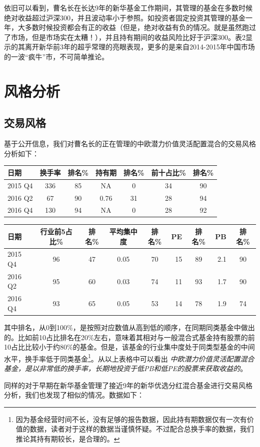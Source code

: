 \documentclass[hyperref,]{ctexart}
\begin{document}
依旧可以看到，曹名长在长达9年的新华基金工作期间，其管理的基金在多数时候绝对收益超过沪深300，并且波动率小于参照。如投资者固定投资其管理的基金一年，大多数时候投资都会有正的收益（但是，绝对收益有负的情况。就是虽然跑过了市场，但是市场实在太糟！），并且持有期间的收益风险比好于沪深300。表2显示的其离开新华前3年的超乎常理的亮眼表现，更多的是来自2014-2015年中国市场的一波``疯牛''市，不可简单推论。

\section{风格分析}

\subsection{交易风格}

基于公开信息，我们对曹名长的正在管理的中欧潜力价值灵活配置混合的交易风格分析如下：

\begin{longtable}[]{@{}lcccccc@{}}
\toprule
日期 & 换手率 & 排名\% & 持有期 & 排名\% & 前十占比\% &
排名\%\tabularnewline
\midrule
\endhead
2015 Q4 & 336 & 85 & NA & 0 & 34 & 90\tabularnewline
2016 Q2 & 67 & 90 & 0.76 & 31 & 28 & 94\tabularnewline
2016 Q4 & 130 & 94 & NA & 0 & 28 & 92\tabularnewline
\bottomrule
\end{longtable}

\begin{longtable}[]{@{}lccccrcrc@{}}
\toprule
日期 & 行业前5占比\% & 排名\% & 平均集中度 & 排名\% & PE & 排名\% & PB &
排名\%\tabularnewline
\midrule
\endhead
2015 Q4 & 96 & 47 & 0.05 & 70 & 15 & 89 & 2.1 & 90\tabularnewline
2016 Q2 & 95 & 60 & 0.03 & 74 & 11 & 93 & 1.7 & 90\tabularnewline
2016 Q4 & 93 & 65 & 0.05 & 53 & 14 & 78 & 1.9 & 74\tabularnewline
\bottomrule
\end{longtable}

其中排名，从0到100\%，是按照对应数值从高到低的顺序，在同期同类基金中做出的。比如前10占比排名在20\%左右，意味着其相对与一般混合式基金持有股票的前10占比比较小于约80\%的基金。但是，该基金的行业集中度处于同类型基金的中间水平，换手率低于同类基金\footnote{因为基金经营时间不长，没有足够的报告数据，因此持有期数据仅有一次有价值的数据，读者对于这样的数据当谨慎怀疑。不过配合总换手率的数据，我们推论其持有期较长，是合理的。}。从以上表格中可以看出
\emph{中欧潜力价值灵活配置混合基金，是以非常低的换手率，长期地投资于低PB和低PE的股票来获取收益的}。

同样的对于早期在新华基金管理了接近9年的新华优选分红混合基金进行交易风格分析，我们也发现了相似的情况。数据如下：
\end{document}
